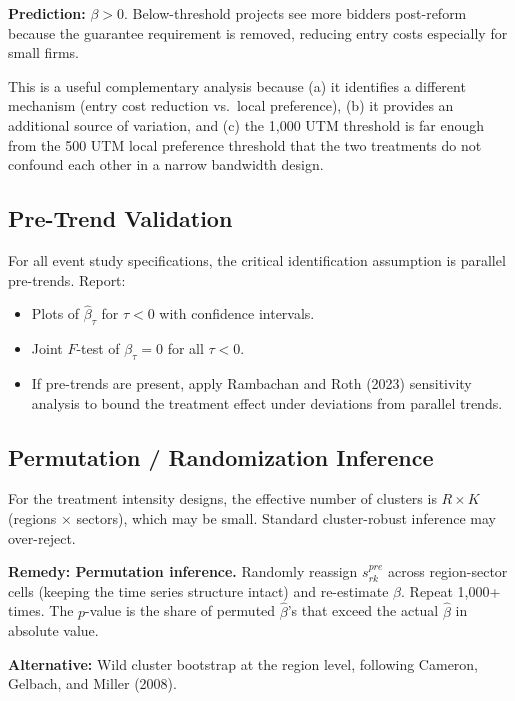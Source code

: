 \documentclass[12pt]{article}
\begin{document}
\textbf{Prediction:} $\beta > 0$. Below-threshold projects see more bidders post-reform because the guarantee requirement is removed, reducing entry costs especially for small firms.

This is a useful complementary analysis because (a) it identifies a different mechanism (entry cost reduction vs.\ local preference), (b) it provides an additional source of variation, and (c) the 1,000 UTM threshold is far enough from the 500 UTM local preference threshold that the two treatments do not confound each other in a narrow bandwidth design.

\subsection{Pre-Trend Validation}

For all event study specifications, the critical identification assumption is parallel pre-trends. Report:
\begin{itemize}[itemsep=4pt]
    \item Plots of $\hat{\beta}_\tau$ for $\tau < 0$ with confidence intervals.
    \item Joint $F$-test of $\beta_\tau = 0$ for all $\tau < 0$.
    \item If pre-trends are present, apply Rambachan and Roth (2023) sensitivity analysis to bound the treatment effect under deviations from parallel trends.
\end{itemize}

\subsection{Permutation / Randomization Inference}

For the treatment intensity designs, the effective number of clusters is $R \times K$ (regions $\times$ sectors), which may be small. Standard cluster-robust inference may over-reject.

\medskip
\noindent \textbf{Remedy: Permutation inference.} Randomly reassign $s_{rk}^{pre}$ across region-sector cells (keeping the time series structure intact) and re-estimate $\beta$. Repeat 1,000+ times. The $p$-value is the share of permuted $\hat{\beta}$'s that exceed the actual $\hat{\beta}$ in absolute value.

\medskip
\noindent \textbf{Alternative:} Wild cluster bootstrap at the region level, following Cameron, Gelbach, and Miller (2008).

\end{document}
